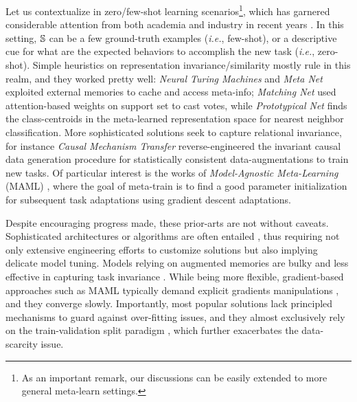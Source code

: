 \documentclass[nohyperref]{article}
\theoremstyle{plain}
\theoremstyle{definition}
\theoremstyle{remark}
\begin{document}
Let us contextualize in zero/few-shot learning scenarios\footnote{As an important remark, our discussions can be easily extended to more general meta-learn settings. }, which has garnered considerable attention from both academia and industry in recent years \citep{}. In this setting, $\mathbb{S}$ can be a few ground-truth examples ({\it i.e.}, few-shot), or a descriptive cue for what are the expected behaviors to accomplish the new task ({\it i.e.}, zero-shot). Simple heuristics on representation invariance/similarity mostly rule in this realm, and they worked pretty well: {\it Neural Turing Machines} \citep{graves2014neural}  and {\it Meta Net} \citep{munkhdalai2017meta} exploited external memories to cache and access meta-info; {\it Matching Net} \citep{munkhdalai2017meta} used attention-based weights on support set to cast votes, while {\it Prototypical Net} \citep{snell2017prototypical} finds the class-centroids in the meta-learned representation space for nearest neighbor classification.  More sophisticated solutions seek to capture relational invariance, for instance {\it Causal Mechanism Transfer} \citep{teshima2020few, xiu2021supercharging} reverse-engineered the invariant causal data generation procedure for statistically consistent data-augmentations to train new tasks. Of particular interest is the works of {\it Model-Agnostic Meta-Learning} (MAML) \citep{finn2017model, nichol2018first, rajeswaran2019meta, raghu2019rapid}, where the goal of meta-train is to find a good parameter initialization for subsequent task adaptations using gradient descent adaptations. 

Despite encouraging progress made, these prior-arts are not without caveats. Sophisticated architectures or algorithms are often entailed \citep{graves2014neural, munkhdalai2017meta, teshima2020few}, thus requiring not only extensive engineering efforts to customize solutions but also implying delicate model tuning. Models relying on augmented memories are bulky and less effective in capturing task invariance \citep{arjovsky2019invariant}. While being more flexible, gradient-based approaches such as MAML typically demand explicit gradients manipulations \citep{zhou2021meta}, and they converge slowly. Importantly, most popular solutions lack principled mechanisms to guard against over-fitting issues, and they almost exclusively rely on the train-validation split paradigm \citep{bai2021important}, which further exacerbates the data-scarcity issue. 
\end{document}
